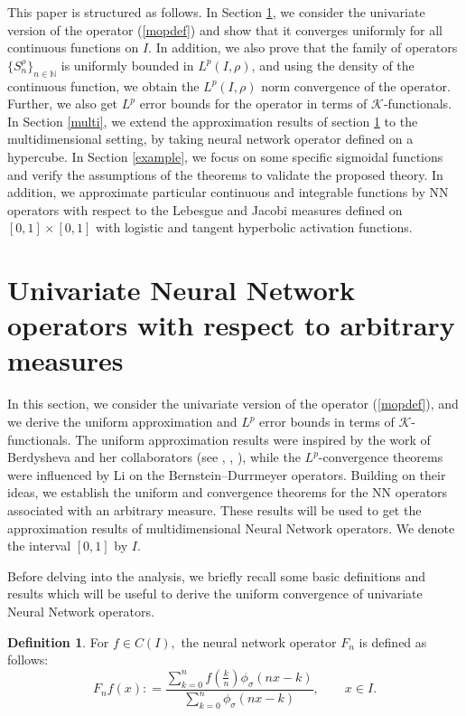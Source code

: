 \documentclass[12pt, reqno]{amsart}
\numberwithin{equation}{section}
\theoremstyle{definition}
\newtheorem{definition}[theorem]{Definition}
\theoremstyle{remark}
\numberwithin{equation}{section}
\newcommand{\N}{\mathbb{N}}
\newcommand{\Lp}{L^p(I, \rho)}
\begin{document}
This paper is structured as follows. In Section \ref{Uni}, we consider the univariate version of the operator (\ref{mopdef}) and show that it converges uniformly for all continuous functions on $I.$ In addition, we also prove that the family of operators $\{S_n^\rho\}_{n\in\N}$ is uniformly bounded in $\Lp$, and using the density of the continuous function, we obtain the $\Lp$ norm convergence of the operator. Further, we also get $L^p$ error bounds for the operator in terms of $\mathcal{K}$-functionals. In Section \ref{multi}, we extend the approximation results of section \ref{Uni} to the multidimensional setting, by taking neural network operator defined on a hypercube. In Section \ref{example}, we focus on some specific sigmoidal functions and verify the assumptions of the theorems to validate the proposed theory. In addition, we approximate particular continuous and integrable functions by NN operators with respect to the Lebesgue and Jacobi measures defined on $[0,1]\times[0,1]$ with logistic and tangent hyperbolic activation functions. 











\section{Univariate Neural Network operators with respect to arbitrary measures} \label{Uni}
In this section, we consider the univariate version of the operator (\ref{mopdef}), and we derive the uniform approximation and $L^p$ error bounds in terms of $\mathcal{K}$-functionals.
The uniform approximation results were inspired by the work of Berdysheva and her collaborators (see \cite{Elena1}, \cite{Elena2}, \cite{Elena3}), while the $L^p$-convergence theorems were influenced by Li \cite{BZli} on the Bernstein–Durrmeyer operators. Building on their ideas, we establish the uniform and 
convergence theorems for the NN operators associated with an arbitrary measure.
These results will be used to get the approximation results of multidimensional Neural Network operators.  We denote the interval $[0,1]$ by $I.$

Before delving into the analysis,  we briefly recall some basic definitions and results which will be useful to derive the uniform convergence of univariate Neural Network operators. 
\begin{definition}
For $f\in C(I),$ the neural network operator $F_n$ is defined as follows: 
$$ F_nf (x): =\dfrac{\displaystyle{\sum_{k=0}^n}f\left(\frac{k}{n}\right)\phi_\sigma(nx-k)}{\displaystyle{\sum_{k=0}^n}\phi_\sigma(nx-k)}, \quad\quad x\in I.$$ 
\end{definition}
\end{document}
